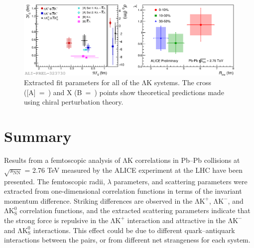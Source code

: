 \documentclass{svproc}
\newcommand{\LamK}{$\mathrm{\Lambda}\mathrm{K}$\xspace}
\newcommand{\LamKchP}{$\mathrm{\Lambda}\mathrm{K^{+}}$\xspace}
\newcommand{\LamKchM}{$\mathrm{\Lambda}\mathrm{K^{-}}$\xspace}
\newcommand{\LamKs}{$\mathrm{\Lambda}\mathrm{K^{0}_{S}}$\xspace}
\begin{document}
\begin{figure}[h]
  \centering
  \includegraphics[width=\textwidth]{./Figures/Approved/OtherFormats/EPS/2019-06-11-FinalResults_Comp3An.eps}
  \caption[Extracted Scattering Parameters]
  {
  Extracted fit parameters for all of the \LamK systems.  
  The cross ([A]~=~\cite{Liu:2006xja}) and X (B~=~\cite{Mai:2009ce}) points show theoretical predictions made using chiral perturbation theory.
  }
  \label{fig:ScattParams_3Res}
\end{figure}





\section{Summary}
\label{sec:Summary}
Results from a femtoscopic analysis of \LamK correlations in Pb--Pb collisions at $\sqrt{s_{\mathrm{NN}}}$ = 2.76 TeV measured by the ALICE experiment at the LHC have been presented.
The femtoscopic radii, $\lambda$ parameters, and scattering parameters were extracted from one-dimensional correlation functions in terms of the invariant momentum difference.
Striking differences are observed in the \LamKchP, \LamKchM, and \LamKs correlation functions, and the extracted scattering parameters indicate that the strong force is repulsive in the \LamKchP interaction and attractive in the \LamKchM and \LamKs interactions.
This effect could be due to different quark--antiquark interactions between the pairs, or from different net strangeness for each system. 



\newpage
\appendix
%
\renewcommand{\thesubfigure}{\thefigure(\alph{subfigure})}
\makeatletter
\renewcommand{\p@subfigure}{}
\renewcommand{\@thesubfigure}{(\alph{subfigure})\hskip\subfiglabelskip}
%


\end{document}
